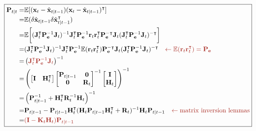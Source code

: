 \documentclass[10pt]{article}
\begin{document}
	
	\begin{equation}  
		\boxed{	\begin{aligned}
				\mathbf{P}_{t|t}
				=& \mathbb{E}[(\mathbf{x}_{t} - \hat{\mathbf{x}}_{t|t-1})(\mathbf{x}_{t} - \hat{\mathbf{x}}_{t|t-1})^{\intercal}] \\
				=& \mathbb{E}(\delta \hat{\mathbf{x}}_{t|t-1}\delta \hat{\mathbf{x}}_{t|t-1}^{\intercal}) \\
				=& \mathbb{E}\bigg[
				(\mathbf{J}_{t}^{\intercal} \mathbf{P}_{\mathbf{e}}^{-1} \mathbf{J}_{t})^{-1} \mathbf{J}_{t}^{\intercal} \mathbf{P}_{\mathbf{e}}^{-1} \mathbf{r}_{t}
				\mathbf{r}_{t}^{\intercal} \mathbf{P}_{\mathbf{e}}^{-\intercal} \mathbf{J}_{t} (\mathbf{J}_{t}^{\intercal} \mathbf{P}_{\mathbf{e}}^{-1} \mathbf{J}_{t})^{-\intercal} \bigg] \\
				=&
				(\mathbf{J}_{t}^{\intercal} \mathbf{P}_{\mathbf{e}}^{-1} \mathbf{J}_{t})^{-1} \mathbf{J}_{t}^{\intercal} \mathbf{P}_{\mathbf{e}}^{-1} \mathbb{E}(\mathbf{r}_{t}
				\mathbf{r}_{t}^{\intercal}) \mathbf{P}_{\mathbf{e}}^{-\intercal} \mathbf{J}_{t} (\mathbf{J}_{t}^{\intercal} \mathbf{P}_{\mathbf{e}}^{-1} \mathbf{J}_{t})^{-\intercal} \quad {\color{Mahogany}\leftarrow \mathbb{E}(\mathbf{r}_{t}\mathbf{r}_{t}^{\intercal}) = \mathbf{P}_{\mathbf{e}} } \\  
				=& \left(
				{\color{Mahogany}{\mathbf{J}_{t}^{\intercal} \mathbf{P}_{\mathbf{e}}^{-1} \mathbf{J}_{t}}}
				\right)^{-1} \\
				=& \left(
				\begin{bmatrix} \mathbf{I} & \mathbf{H}_{t}^{\intercal} \end{bmatrix}
				\begin{bmatrix} \mathbf{P}_{t|t-1} & \mathbf{0} \\ \mathbf{0} & \mathbf{R}_{t} \end{bmatrix}^{-1}
				\begin{bmatrix} \mathbf{I} \\ \mathbf{H}_{t} \end{bmatrix}
				\right)^{-1} \\
				=& \left( \mathbf{P}_{t|t-1}^{-1} + \mathbf{H}_{t}^{\intercal}\mathbf{R}_{t}^{-1}\mathbf{H}_{t} \right)^{-1} \\
				=& \mathbf{P}_{t|t-1} - \mathbf{P}_{t|t-1}\mathbf{H}_{t}^{\intercal} (\mathbf{H}_{t}\mathbf{P}_{t|t-1}\mathbf{H}_{t}^{\intercal} + \mathbf{R}_{t})^{-1} \mathbf{H}_{t} \mathbf{P}_{t|t-1} \quad {\color{Mahogany} \leftarrow \text{matrix inversion lemmas} } \\
				=& {\color{Mahogany}{(\mathbf{I} - \mathbf{K}_{t}\mathbf{H}_{t}) \mathbf{P}_{t|t-1}}}
		\end{aligned} }
	\end{equation}
	
\end{document}
